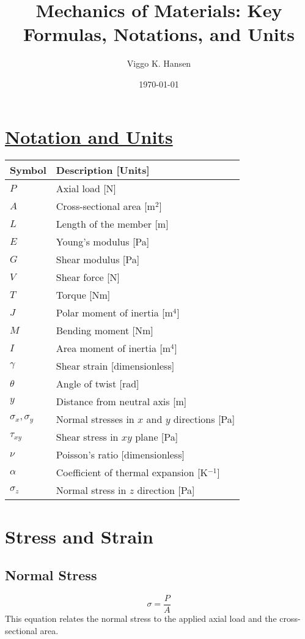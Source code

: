 \documentclass[12pt]{article}
\title{Mechanics of Materials: Key Formulas, Notations, and Units}
\author{Viggo K. Hansen}
\date{\today}
\begin{document}
\maketitle

\tableofcontents

\section{\hyperref[sec:notation]{Notation and Units}}
\label{sec:notation}
\begin{tabular}{ll}
    \toprule
    Symbol & Description [Units] \\
    \midrule
    $P$ & Axial load [N] \\
    $A$ & Cross-sectional area [m$^2$] \\
    $L$ & Length of the member [m] \\
    $E$ & Young's modulus [Pa] \\
    $G$ & Shear modulus [Pa] \\
    $V$ & Shear force [N] \\
    $T$ & Torque [Nm] \\
    $J$ & Polar moment of inertia [m$^4$] \\
    $M$ & Bending moment [Nm] \\
    $I$ & Area moment of inertia [m$^4$] \\
    $\gamma$ & Shear strain [dimensionless] \\
    $\theta$ & Angle of twist [rad] \\
    $y$ & Distance from neutral axis [m] \\
    $\sigma_x, \sigma_y$ & Normal stresses in $x$ and $y$ directions [Pa] \\
    $\tau_{xy}$ & Shear stress in $xy$ plane [Pa] \\
    $\nu$ & Poisson's ratio [dimensionless] \\
    $\alpha$ & Coefficient of thermal expansion [K$^{-1}$] \\
    $\sigma_z$ & Normal stress in $z$ direction [Pa] \\
    \bottomrule
\end{tabular}

\section{Stress and Strain}
\subsection{Normal Stress}
\begin{equation}
\sigma = \frac{P}{A}
\end{equation}
This equation relates the normal stress to the applied axial load and the cross-sectional area.
\end{document}
